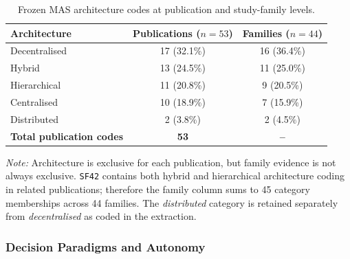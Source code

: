 \documentclass[11pt,a4paper]{article}
\begin{document}
\begin{table}[htbp]
\centering
\small

\caption{Frozen MAS architecture codes at publication
and study-family levels.}

\label{tab:rq1_architectures}

\begin{tabular}{lcc}
\toprule

\textbf{Architecture} &
\textbf{Publications ($n=53$)} &
\textbf{Families ($n=44$)} \\

\midrule

Decentralised & 17 (32.1\%) & 16 (36.4\%) \\

Hybrid & 13 (24.5\%) & 11 (25.0\%) \\

Hierarchical & 11 (20.8\%) & 9 (20.5\%) \\

Centralised & 10 (18.9\%) & 7 (15.9\%) \\

Distributed & 2 (3.8\%) & 2 (4.5\%) \\

\midrule

\textbf{Total publication codes} &
\textbf{53} & \textbf{--} \\

\bottomrule
\end{tabular}

\par\smallskip

\begin{minipage}{\textwidth}
\footnotesize
\emph{Note:} Architecture is exclusive for each
publication, but family evidence is not always exclusive.
\texttt{SF42} contains both hybrid and hierarchical
architecture coding in related publications; therefore
the family column sums to 45 category memberships across
44 families. The \emph{distributed} category is retained
separately from \emph{decentralised} as coded in
the extraction.
\end{minipage}

\end{table}

\subsubsection{Decision Paradigms and Autonomy}
\end{document}

